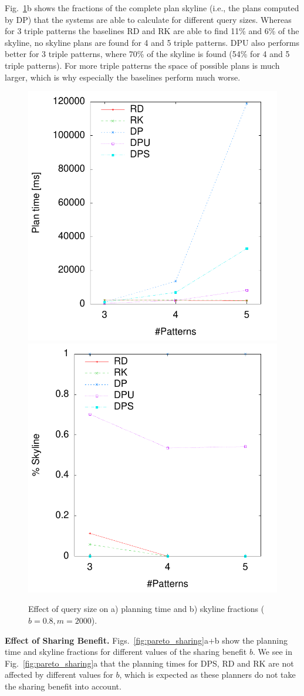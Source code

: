 
Fig.~\ref{fig:pareto_tp}b shows the fractions of the complete plan
skyline (i.e., the plans computed by DP) that the systems are able to
calculate for different query sizes. Whereas for 3 triple patterns the
baselines RD and RK are able to find 11\% and 6\% of the skyline, no
skyline plans are found for 4 and 5 triple patterns. DPU also performs
better for 3 triple patterns, where 70\% of the skyline is found (54\%
for 4 and 5 triple patterns). For more triple patterns the space of
possible plans is much larger, which is why especially the baselines
perform much worse.

\begin{figure}[htb]
  \centering
  \includegraphics[width=0.49\linewidth]{figs/pareto_plan_tp.pdf}
  \includegraphics[width=0.49\linewidth]{figs/plans_skyline_by_tp.pdf}
  \caption{Effect of query size on a) planning time and b) skyline
    fractions ($b=0.8, m=2000$).}
  \label{fig:pareto_tp}
\end{figure}

\textbf{Effect of Sharing Benefit.} Figs.~\ref{fig:pareto_sharing}a+b
show the planning time and skyline fractions for different values of
the sharing benefit $b$. We see in Fig.~\ref{fig:pareto_sharing}a that
the planning times for DPS, RD and RK are not affected by different
values for $b$, which is expected as these planners do not take the
sharing benefit into account.


